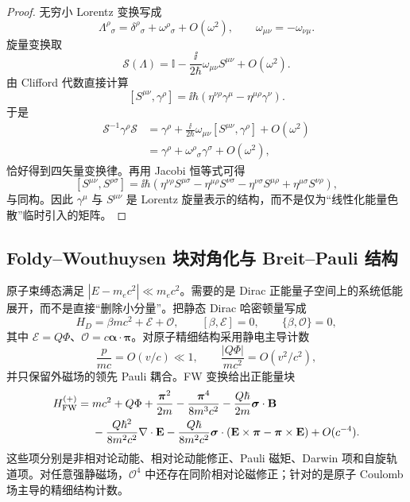 \begin{proof}
无穷小 Lorentz 变换写成
\[
\Lambda^\rho{}_{\sigma}
=\delta^\rho{}_{\sigma}+\omega^\rho{}_{\sigma}+O(\omega^2),
\qquad
\omega_{\mu\nu}=-\omega_{\nu\mu}.
\]
旋量变换取
\[
\mathcal S(\Lambda)
=\mathbb I-\frac{\ii}{2\hbar}\omega_{\mu\nu}S^{\mu\nu}+O(\omega^2).
\]
由 Clifford 代数直接计算
\[
[S^{\mu\nu},\gamma^\rho]
=\ii\hbar
\left(\eta^{\nu\rho}\gamma^\mu-\eta^{\mu\rho}\gamma^\nu\right).
\]
于是
\[
\begin{aligned}
\mathcal S^{-1}\gamma^\rho\mathcal S
&=\gamma^\rho
+\frac{\ii}{2\hbar}\omega_{\mu\nu}
[S^{\mu\nu},\gamma^\rho]+O(\omega^2)\\
&=\gamma^\rho+\omega^\rho{}_{\sigma}\gamma^\sigma+O(\omega^2),
\end{aligned}
\]
恰好得到四矢量变换律。再用 Jacobi 恒等式可得
\[
[S^{\mu\nu},S^{\rho\sigma}]
=\ii\hbar
\left(
\eta^{\nu\rho}S^{\mu\sigma}
-\eta^{\mu\rho}S^{\nu\sigma}
-\eta^{\nu\sigma}S^{\mu\rho}
+\eta^{\mu\sigma}S^{\nu\rho}
\right),
\]
与同构。因此 $\gamma^\mu$ 与 $S^{\mu\nu}$ 是 Lorentz 旋量表示的结构，而不是仅为“线性化能量色散”临时引入的矩阵。
\end{proof}

\subsection{Foldy--Wouthuysen 块对角化与 Breit--Pauli 结构}

原子束缚态满足 $|E-m_ec^2|\ll m_ec^2$。需要的是 Dirac 正能量子空间上的系统低能展开，而不是直接“删除小分量”。把静态 Dirac 哈密顿量写成
\[
H_D=\beta mc^2+\mathcal E+\mathcal O,
\qquad
[\beta,\mathcal E]=0,
\qquad
\{\beta,\mathcal O\}=0,
\]
其中 $\mathcal E=Q\Phi$、$\mathcal O=c\boldsymbol\alpha\cdot\boldsymbol\pi$。对原子精细结构采用静电主导计数
\[
\frac{p}{mc}=O(v/c)\ll1,
\qquad
\frac{|Q\Phi|}{mc^2}=O(v^2/c^2),
\]
并只保留外磁场的领先 Pauli 耦合。FW 变换给出正能量块
\begin{equation}
\begin{aligned}
H_{\rm FW}^{(+)}
={}&mc^2+Q\Phi
+\frac{\boldsymbol\pi^2}{2m}
-\frac{\boldsymbol\pi^4}{8m^3c^2}
-\frac{Q\hbar}{2m}\boldsymbol\sigma\cdot\mathbf B\\
&-\frac{Q\hbar^2}{8m^2c^2}\nabla\cdot\mathbf E
-\frac{Q\hbar}{8m^2c^2}
\boldsymbol\sigma\cdot
\left(\mathbf E\times\boldsymbol\pi-\boldsymbol\pi\times\mathbf E\right)
+O(c^{-4}).
\end{aligned}
\label{eq:fw-general-order-c2}
\end{equation}
这些项分别是非相对论动能、相对论动能修正、Pauli 磁矩、Darwin 项和自旋轨道项。对任意强静磁场，$\mathcal O^4$ 中还存在同阶相对论磁修正；针对的是原子 Coulomb 场主导的精细结构计数。

